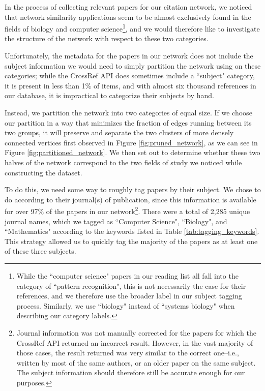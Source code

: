 \documentclass[12pt]{thesis}
\theoremstyle{plain}
\theoremstyle{definition}
\theoremstyle{remark}
\begin{document}
In the process of collecting relevant papers for our citation network, we noticed that network similarity applications seem to be almost exclusively found in the fields of biology and computer science\footnote{While the ``computer science" papers in our reading list all fall into the category of ``pattern recognition", this is not necessarily the case for their references, and we therefore use the broader label in our subject tagging process. Similarly, we use ``biology" instead of ``systems biology" when describing our category labels.}, and we would therefore like to investigate the structure of the network with respect to these two categories. 

Unfortunately, the metadata for the papers in our network does not include the subject information we would need to simply partition the network using on these categories; while the CrossRef API does sometimes include a ``subject" category, it is present in less than 1\% of items, and with almost six thousand references in our database, it is impractical to categorize their subjects by hand.

Instead, we partition the network into two categories of equal size. If we choose our partition in a way that minimizes the fraction of edges running between its two groups, it will preserve and separate the two clusters of more densely connected vertices first observed in Figure \ref{fig:pruned_network}, as we can see in Figure \ref{fig:partitioned_network}. We then set out to determine whether these two halves of the network correspond to the two fields of study we noticed while constructing the dataset.

To do this, we need some way to roughly tag papers by their subject. We chose to do according to their journal(s) of publication, since this information is available for over 97\% of the papers in our network\footnote{Journal information was not manually corrected for the papers for which the CrossRef API returned an incorrect result. However, in the vast majority of those cases, the result returned was very similar to the correct one--i.e., written by most of the same authors, or an older paper on the same subject. The subject information should therefore still be accurate enough for our purposes.}. There were a total of 2,285 unique journal names, which we tagged as ``Computer Science", ``Biology", and ``Mathematics" according to the keywords listed in Table \ref{tab:tagging_keywords}. This strategy allowed us to quickly tag the majority of the papers as at least one of these three subjects.
\end{document}

